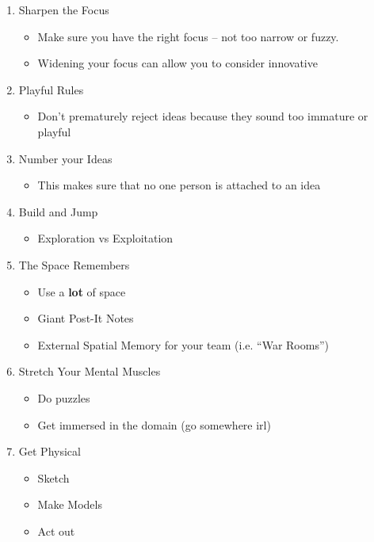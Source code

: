 \begin{enumerate}
    \item Sharpen the Focus
    \begin{itemize}
        \item Make sure you have the right focus -- not too narrow or fuzzy.
        \item Widening your focus can allow you to consider innovative
    \end{itemize}
    
    \item Playful Rules
    \begin{itemize}
        \item Don't prematurely reject ideas because they sound too immature or playful
    \end{itemize}
    
    \item Number your Ideas
    \begin{itemize}
        \item This makes sure that no one person is attached to an idea
    \end{itemize}
    
    \item Build and Jump
    \begin{itemize}
        \item Exploration vs Exploitation
    \end{itemize}
    
    \item The Space Remembers
    \begin{itemize}
        \item Use a \textbf{lot} of space
        \item Giant Post-It Notes
        \item External Spatial Memory for your team (i.e. ``War Rooms'')
    \end{itemize}
    
    \item Stretch Your Mental Muscles
    \begin{itemize}
        \item Do puzzles
        \item Get immersed in the domain (go somewhere irl)
    \end{itemize}
    
    \item Get Physical
    \begin{itemize}
        \item Sketch
        \item Make Models
    \item Act out
    \end{itemize}
\end{enumerate}

